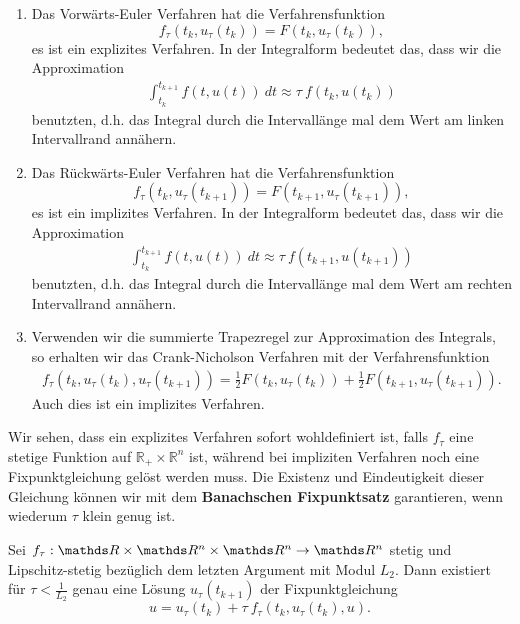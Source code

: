 \begin{example}{}{}
\begin{enumerate}
\item Das Vorwärts-Euler Verfahren hat die Verfahrensfunktion 
$$ f_\tau(t_k, u_\tau(t_k)) = F(t_k,u_\tau(t_k)), $$
es ist ein explizites Verfahren. In der Integralform bedeutet das, dass wir die Approximation
%
\begin{align*}
\int_{t_k}^{t_{k+1}} f(t,u(t))\ dt\approx
\tau\ f(t_k, u(t_k)) 
\end{align*}
benutzten, d.h. das Integral durch die Intervallänge mal dem Wert am linken Intervallrand annähern. 
%
\item Das Rückwärts-Euler Verfahren hat die Verfahrensfunktion 
$$ f_\tau(t_k, u_\tau(t_{k+1})) = F(t_{k+1},u_\tau(t_{k+1})), $$
es ist ein implizites Verfahren. In der Integralform bedeutet das, dass wir die Approximation
%
\begin{align*}
\int_{t_k}^{t_{k+1}} f(t,u(t))\ dt\approx
\tau\ f(t_{k+1}, u(t_{k+1})) 
\end{align*}
benutzten, d.h. das Integral durch die Intervallänge mal dem Wert am rechten Intervallrand annähern.
%
\item Verwenden wir die summierte Trapezregel zur Approximation des Integrals, so erhalten wir das Crank-Nicholson Verfahren mit der Verfahrensfunktion
%
\begin{align*}
f_\tau(t_k, u_\tau(t_k), u_\tau(t_{k+1})) = \frac{1}{2} F(t_{k },u_\tau(t_{k }))+ \frac{1}{2}F(t_{k+1},u_\tau(t_{k+1})).
\end{align*}
Auch dies ist ein implizites Verfahren.
\end{enumerate}
\end{example}
%
Wir sehen, dass ein explizites Verfahren sofort wohldefiniert ist, falls $f_\tau$ eine stetige Funktion auf $\mathbb{R}_+ \times \mathbb{R}^n$ ist, während bei impliziten Verfahren noch eine Fixpunktgleichung gelöst werden muss. Die Existenz und Eindeutigkeit dieser Gleichung können wir mit dem \textbf{Banachschen Fixpunktsatz} garantieren, wenn wiederum $\tau$ klein genug ist.

\begin{lemma}{}{}
Sei $f_\tau:\R\times\R^n\times\R^n\to\R^n$ stetig und Lipschitz-stetig bezüglich dem letzten Argument mit Modul $L_2$. Dann existiert für $\tau< \frac{1}{L_2}$ genau eine Lösung $u_\tau(t_{k+1})$ der Fixpunktgleichung
$$ u = u_\tau(t_k) + \tau\ f_\tau(t_k,u_\tau(t_k),u). $$
\end{lemma}

